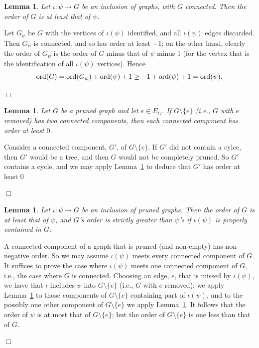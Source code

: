 \documentclass[12pt]{article}
\newtheorem{lemma}[theorem]{Lemma}
\newcommand{\from}{\colon}
\newcommand{\tang}{{\psi}}	%
\newcommand{\proof}{{\par\noindent {\bf Proof}\space\space}}
\newcommand{\proofbox}{\begin{flushright}$\Box$\end{flushright}}
\begin{document}
\begin{lemma}\label{lm:inclusion_order}
Let $\iota\from \tang\to G$ be an inclusion of graphs, with
$G$ connected.
Then the order of $G$ is at least that of $\tang$.
\end{lemma}
\proof Let $G_\tang$ be $G$ with the vertices of $\iota(\tang)$ identified, and
all $\iota(\tang)$ edges discarded.  Then $G_\tang$ is connected, and so has
order at least
$-1$; on the other hand, clearly the order of $G_\tang$ is the
order of $G$ minus that of $\tang$ minus $1$ (for the vertex that is the
identification of all $\iota(\tang)$ vertices).
Hence
$$
{\rm ord}(G) = {\rm ord}(G_\tang) + {\rm ord}(\tang) +1 \ge
-1+{\rm ord}(\tang)+1={\rm ord}(\tang).
$$
\proofbox

\begin{lemma}\label{lm:edge_removal}
Let $G$ be a pruned graph and let $e\in E_G$.  If $G\setminus\{e\}$
(i.e., $G$ with $e$ removed) has two connected components, then each
connected component has order at least $0$.
\end{lemma}
\proof
Consider a connected component, $G'$, of $G\setminus\{e\}$.  If $G'$ did not
contain a cylce, then $G'$ would be a tree, and 
then $G$ would not be completely pruned.
So $G'$ contains a cycle, and we may apply Lemma~\ref{lm:inclusion_order}
to deduce that $G'$ has order at least $0$
\proofbox

\begin{lemma}
\label{lm:order_increases}
Let $\iota\from \tang\to G$ be an inclusion of pruned graphs.
Then the order of $G$ is at least that of $\tang$, and $G$'s order is strictly
greater than $\tang$'s if $\iota(\tang)$ is properly
contained in $G$.
\end{lemma}
\proof A connected component of a graph that is pruned (and non-empty)
has non-negative order.  So we may assume $\iota(\tang)$ meets every connected
component of $G$.  It suffices to prove the case where $\iota(\tang)$ meets
one connected component of $G$, i.e., the case where $G$ is connected.
Choosing an edge, $e$, that is missed by $\iota(\tang)$, we have that
$\iota$ includes $\tang$ into $G\setminus\{e\}$ (i.e., $G$ with
$e$ removed); we apply Lemma~\ref{lm:inclusion_order} to those components
of $G\setminus\{e\}$ containing part of $\iota(\tang)$, and to the 
possibly one other component of $G\setminus\{e\}$ we apply
Lemma~\ref{lm:edge_removal}.
It follows that the order of $\tang$ is at most that of 
$G\setminus\{e\}$; but the order of $G\setminus\{e\}$ is one less than
that of $G$.
\proofbox
\end{document}
